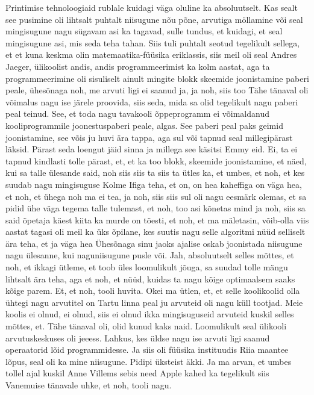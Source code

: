 Printimise tehnoloogiaid rublale kuidagi väga oluline ka absoluutselt. Kas sealt see pusimine oli lihtsalt puhtalt niisugune nõu põne, arvutiga möllamine või seal mingisugune nagu sügavam asi ka tagavad, sulle tundus, et kuidagi, et seal mingisugune asi, mis seda teha tahan.
Siis tuli puhtalt seotud tegelikult sellega, et et kuna keskma olin matemaatika-füüsika eriklassis, siis meil oli seal Andres Jaeger, ülikoolist andis, andis programmeerimist ka kolm aastat, aga ta programmeerimine oli sisuliselt ainult mingite blokk skeemide joonistamine paberi peale, ühesõnaga noh, me arvuti ligi ei saanud ja, ja noh, siis too Tähe tänaval oli võimalus nagu ise järele proovida, siis seda, mida sa olid tegelikult nagu paberi peal teinud. See, et toda nagu tavakooli õppeprogramm ei võimaldanud kooliprogrammile joonestuspaberi peale, algas.
See paberi peal paks geimid joonistamine, see võis ju huvi ära tappa, aga sul või tapnud seal millegipärast läksid. Pärast seda loengut jäid sinna ja millega see käsitsi Emmy eid.
Ei, ta ei tapnud kindlasti tolle pärast, et, et ka too blokk, skeemide joonistamine, et näed, kui sa talle ülesande said, noh siis siis ta siis ta ütles ka, et umbes, et noh, et kes suudab nagu mingisuguse
Kolme Ifiga teha, et on, on hea kaheffiga on väga hea, et noh, et ühega noh ma ei tea, ja noh, siis siis sul oli nagu eesmärk olemas, et sa pidid ühe väga tegema talle tulemast, et noh, too asi kõnetas mind ja noh, siis sa said õpetaja käest kiita ka murde on tõesti, et noh, et ma mäletasin, võib-olla viis aastat tagasi oli meil ka üks õpilane, kes suutis nagu selle algoritmi nüüd selliselt ära teha, et ja väga hea
Ühesõnaga sinu jaoks ajalise oskab joonistada niisugune nagu ülesanne, kui naguniisugune pusle või.
Jah, absoluutselt selles mõttes, et noh, et ikkagi ütleme, et toob üles loomulikult jõuga, sa suudad tolle mängu lihtsalt ära teha, aga et noh, et nüüd, kuidas ta nagu kõige optimaalsem saaks kõige parem. Et, et noh, tooli huvita.
Okei ma ütlen, et, et selle koolikoolid olla ühtegi nagu arvutitel on Tartu linna peal ju arvuteid oli nagu küll tootjad.
Meie koolis ei olnud, ei olnud, siis ei olnud ikka mingisuguseid arvuteid kuskil selles mõttes, et.
Tähe tänaval oli, olid kunud kaks naid. Loomulikult seal ülikooli arvutuskeskuses oli jeeess. Lahkus, kes üldse nagu ise arvuti ligi saanud operaatorid lõid programmidesse. Ja siis oli füüsika instituudis Riia maantee lõpus, seal oli ka mine niisugune.
Pidipi üksteist äkki.
Ja ma arvan, et umbes tollel ajal kuskil Anne Villems sebis need Apple kahed ka tegelikult siis Vanemuise tänavale uhke, et noh, tooli nagu.
